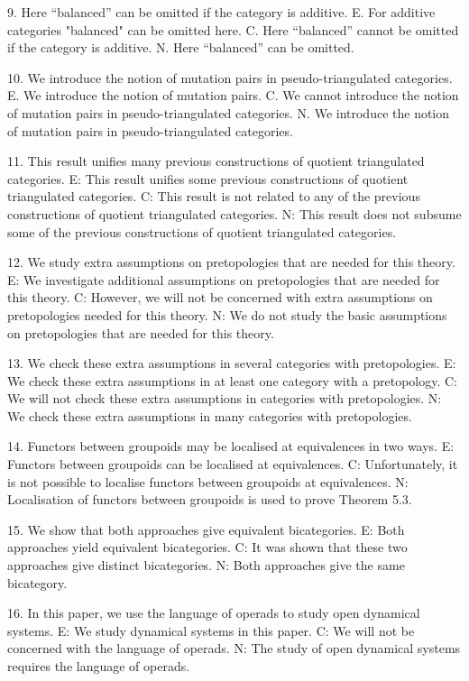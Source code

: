 9. Here ``balanced'' can be omitted if the category is additive.
E. For additive categories "balanced" can be omitted here.
C. Here ``balanced'' cannot be omitted if the category is additive.
N. Here ``balanced'' can be omitted.

10. We introduce the notion of mutation pairs in pseudo-triangulated categories.
E. We introduce the notion of mutation pairs.
C. We cannot introduce the notion of mutation pairs in pseudo-triangulated categories.
N. We introduce the notion of mutation pairs in pseudo-triangulated categories.

11. This result unifies many previous constructions of quotient triangulated categories.
E: This result unifies some previous constructions of quotient triangulated categories.
C: This result is not related to any of the previous constructions of quotient triangulated categories.
N: This result does not subsume some of the previous constructions of quotient triangulated categories.

12. We study extra assumptions on pretopologies that are needed for this theory.
E: We investigate additional assumptions on pretopologies that are needed for this theory.
C: However, we will not be concerned with extra assumptions on pretopologies needed for this theory.
N: We do not study the basic assumptions on pretopologies that are needed for this theory.

13. We check these extra assumptions in several categories with pretopologies.
E: We check these extra assumptions in at least one category with a pretopology.
C: We will not check these extra assumptions in categories with pretopologies.
N: We check these extra assumptions in many categories with pretopologies.

14. Functors between groupoids may be localised at equivalences in two ways.
E: Functors between groupoids can be localised at equivalences.
C: Unfortunately, it is not possible to localise functors between groupoids at equivalences.
N: Localisation of functors between groupoids is used to prove Theorem 5.3.

15. We show that both approaches give equivalent bicategories.
E: Both approaches yield equivalent bicategories.
C: It was shown that these two approaches give distinct bicategories.
N: Both approaches give the same bicategory.

16. In this paper, we use the language of operads to study open dynamical systems.
E: We study dynamical systems in this paper.
C: We will not be concerned with the language of operads.
N: The study of open dynamical systems requires the language of operads.

